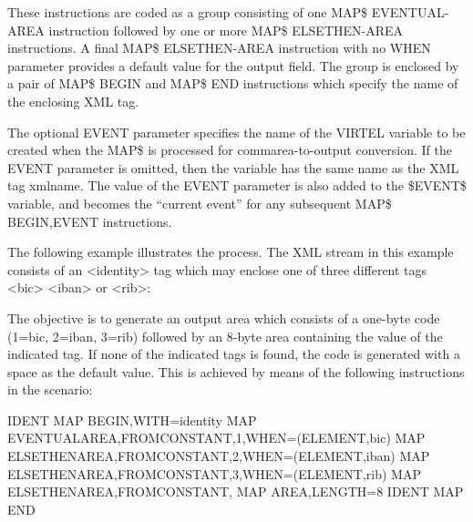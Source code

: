 \documentclass[letterpaper,10pt,english]{sphinxmanual}
\begin{document}
These instructions are coded as a group consisting of one MAP\$ EVENTUAL-AREA instruction followed by one or more
MAP\$ ELSETHEN-AREA instructions. A final MAP\$ ELSETHEN-AREA instruction with no WHEN parameter provides a
default value for the output field. The group is enclosed by a pair of MAP\$ BEGIN and MAP\$ END instructions which
specify the name of the enclosing XML tag.

The optional EVENT parameter specifies the name of the VIRTEL variable to be created when the MAP\$ is processed
for commarea-to-output conversion. If the EVENT parameter is omitted, then the variable has the same name as the
XML tag xmlname. The value of the EVENT parameter is also added to the \$EVENT\$ variable, and becomes the
“current event” for any subsequent MAP\$ BEGIN,EVENT instructions.

The following example illustrates the process. The XML stream in this example consists of an \textless{}identity\textgreater{} tag which may
enclose one of three different tags \textless{}bic\textgreater{} \textless{}iban\textgreater{} or \textless{}rib\textgreater{}:

\begin{sphinxVerbatim}[commandchars=\\\{\}]
\end{sphinxVerbatim}

The objective is to generate an output area which consists of a one-byte code (1=bic, 2=iban, 3=rib) followed by an
8-byte area containing the value of the indicated tag. If none of the indicated tags is found, the code is generated with
a space as the default value. This is achieved by means of the following instructions in the scenario:

\begin{sphinxVerbatim}[commandchars=\\\{\}]
IDENT MAP\PYGZdl{} BEGIN,WITH=\PYGZsq{}identity\PYGZsq{}
MAP\PYGZdl{} EVENTUAL\PYGZhy{}AREA,FROM\PYGZhy{}CONSTANT,\PYGZsq{}1\PYGZsq{},WHEN=(ELEMENT,\PYGZsq{}bic\PYGZsq{})
MAP\PYGZdl{} ELSETHEN\PYGZhy{}AREA,FROM\PYGZhy{}CONSTANT,\PYGZsq{}2\PYGZsq{},WHEN=(ELEMENT,\PYGZsq{}iban\PYGZsq{})
MAP\PYGZdl{} ELSETHEN\PYGZhy{}AREA,FROM\PYGZhy{}CONSTANT,\PYGZsq{}3\PYGZsq{},WHEN=(ELEMENT,\PYGZsq{}rib\PYGZsq{})
MAP\PYGZdl{} ELSETHEN\PYGZhy{}AREA,FROM\PYGZhy{}CONSTANT,\PYGZsq{} \PYGZsq{}
MAP\PYGZdl{} AREA,LENGTH=8
IDENT MAP\PYGZdl{} END
\end{sphinxVerbatim}
\end{document}

